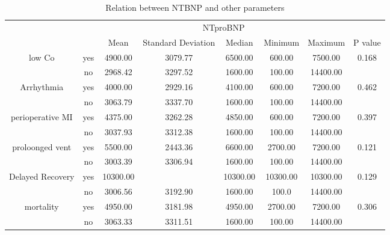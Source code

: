 \documentclass[14pt,a4paper,onecolumn]{extarticle}
\begin{document}
\begin{landscape}
\begin{table}[]
\centering
\caption{Relation between NTBNP and other parameters}
\label{Result_relation_parameters}
\begin{tabular}{cccccccc}
\hline
                                  &     & \multicolumn{5}{c}{NTproBNP}                                   &                        \\
                                  &     & Mean     & Standard Deviation & Median   & Minimum  & Maximum  & P value                \\ \hline
\multirow{2}{*}{low Co}           & yes & 4900.00  & 3079.77            & 6500.00  & 600.00   & 7500.00  & \multirow{2}{*}{0.168} \\
                                  & no  & 2968.42  & 3297.52            & 1600.00  & 100.00   & 14400.00 &                        \\ \hline
\multirow{2}{*}{Arrhythmia}       & yes & 4000.00  & 2929.16            & 4100.00  & 600.00   & 7200.00  & \multirow{2}{*}{0.462} \\
                                  & no  & 3063.79  & 3337.70            & 1600.00  & 100.00   & 14400.00 &                        \\ \hline
\multirow{2}{*}{perioperative MI} & yes & 4375.00  & 3262.28            & 4850.00  & 600.00   & 7200.00  & \multirow{2}{*}{0.397} \\
                                  & no  & 3037.93  & 3312.38            & 1600.00  & 100.00   & 14400.00 &                        \\ \hline
\multirow{2}{*}{proloonged vent}  & yes & 5500.00  & 2443.36            & 6600.00  & 2700.00  & 7200.00  & \multirow{2}{*}{0.121} \\
                                  & no  & 3003.39  & 3306.94            & 1600.00  & 100.00   & 14400.00 &                        \\ \hline
\multirow{2}{*}{Delayed Recovery} & yes & 10300.00 &                    & 10300.00 & 10300.00 & 10300.00 & \multirow{2}{*}{0.129} \\
                                  & no  & 3006.56  & 3192.90            & 1600.00  & 100.0    & 14400.00 &                        \\ \hline
\multirow{2}{*}{mortality}        & yes & 4950.00  & 3181.98            & 4950.00  & 2700.00  & 7200.00  & \multirow{2}{*}{0.306} \\
                                  & no  & 3063.33  & 3311.51            & 1600.00  & 100.00   & 14400.00 &                        \\ \hline

\end{tabular}
\end{table}
\end{landscape}
\end{document}
